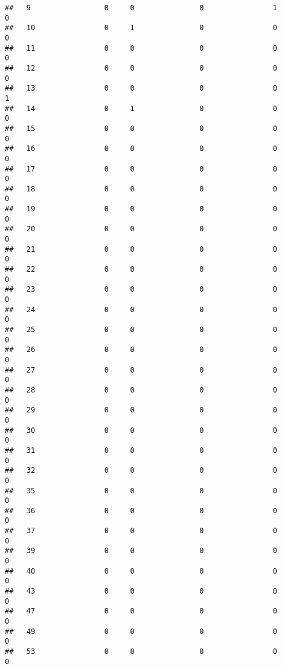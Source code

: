 \documentclass[]{article}
\begin{document}
\begin{verbatim}
##   9                 0     0               0                1                0
##   10                0     1               0                0                0
##   11                0     0               0                0                0
##   12                0     0               0                0                0
##   13                0     0               0                0                1
##   14                0     1               0                0                0
##   15                0     0               0                0                0
##   16                0     0               0                0                0
##   17                0     0               0                0                0
##   18                0     0               0                0                0
##   19                0     0               0                0                0
##   20                0     0               0                0                0
##   21                0     0               0                0                0
##   22                0     0               0                0                0
##   23                0     0               0                0                0
##   24                0     0               0                0                0
##   25                0     0               0                0                0
##   26                0     0               0                0                0
##   27                0     0               0                0                0
##   28                0     0               0                0                0
##   29                0     0               0                0                0
##   30                0     0               0                0                0
##   31                0     0               0                0                0
##   32                0     0               0                0                0
##   35                0     0               0                0                0
##   36                0     0               0                0                0
##   37                0     0               0                0                0
##   39                0     0               0                0                0
##   40                0     0               0                0                0
##   43                0     0               0                0                0
##   47                0     0               0                0                0
##   49                0     0               0                0                0
##   53                0     0               0                0                0

\end{verbatim}
\end{document}

